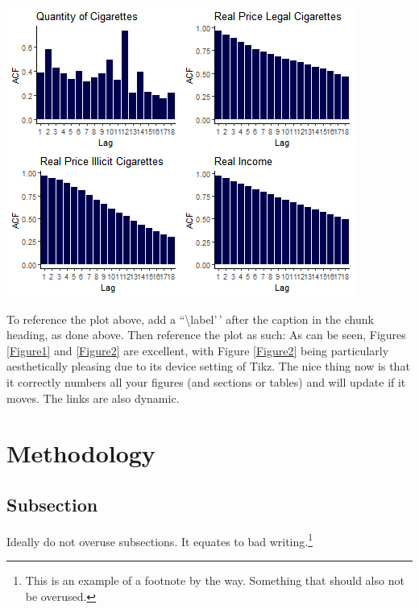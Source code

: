 \documentclass[11pt,preprint, authoryear]{elsarticle}
\let\origfigure\figure
\let\endorigfigure\endfigure
\renewenvironment{figure}[1][2] {
    \expandafter\origfigure\expandafter[H]
} {
    \endorigfigure
}
\numberwithin{equation}{section}
\numberwithin{figure}{section}
\numberwithin{table}{section}
\let\rmarkdownfootnote\footnote%
\def\footnote{\protect\rmarkdownfootnote}
\begin{document}
\begin{figure}[H]

{\centering \includegraphics{Thesis_files/figure-latex/Figure3-5} 

}

\caption{Autocorrelation Function Plots \label{ACF}}\label{fig:Figure3-5}
\end{figure}

To reference the plot above, add a ``\textbackslash label'\,' after the
caption in the chunk heading, as done above. Then reference the plot as
such: As can be seen, Figures \ref{Figure1} and \ref{Figure2} are
excellent, with Figure \ref{Figure2} being particularly aesthetically
pleasing due to its device setting of Tikz. The nice thing now is that
it correctly numbers all your figures (and sections or tables) and will
update if it moves. The links are also dynamic.

\hypertarget{methodology}{%
\section{\texorpdfstring{Methodology
\label{method}}{Methodology }}\label{methodology}}

\hypertarget{subsection}{%
\subsection{Subsection}\label{subsection}}

Ideally do not overuse subsections. It equates to bad
writing.\footnote{This is an example of a footnote by the way. Something
  that should also not be overused.}
\end{document}
